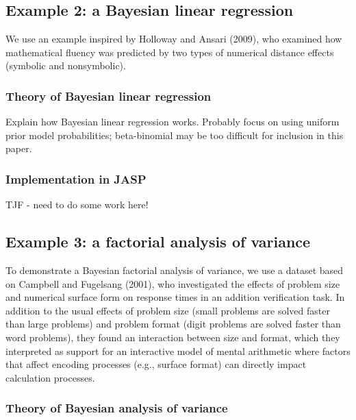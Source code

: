 \documentclass[english,,doc,floatsintext]{apa6}
\begin{document}
\hypertarget{example-2-a-bayesian-linear-regression}{%
\subsection{Example 2: a Bayesian linear regression}\label{example-2-a-bayesian-linear-regression}}

We use an example inspired by Holloway and Ansari (2009), who examined how mathematical fluency was predicted by two types of numerical distance effects (symbolic and nonsymbolic).

\hypertarget{theory-of-bayesian-linear-regression}{%
\subsubsection{Theory of Bayesian linear regression}\label{theory-of-bayesian-linear-regression}}

Explain how Bayesian linear regression works. Probably focus on using uniform prior model probabilities; beta-binomial may be too difficult for inclusion in this paper.

\hypertarget{implementation-in-jasp-1}{%
\subsubsection{Implementation in JASP}\label{implementation-in-jasp-1}}

TJF - need to do some work here!

\hypertarget{example-3-a-factorial-analysis-of-variance}{%
\subsection{Example 3: a factorial analysis of variance}\label{example-3-a-factorial-analysis-of-variance}}

To demonstrate a Bayesian factorial analysis of variance, we use a dataset based on Campbell and Fugelsang (2001), who investigated the effects of problem size and numerical surface form on response times in an addition verification task. In addition to the usual effects of problem size (small problems are solved faster than large problems) and problem format (digit problems are solved faster than word problems), they found an interaction between size and format, which they interpreted as support for an interactive model of mental arithmetic where factors that affect encoding processes (e.g., surface format) can directly impact calculation processes.

\hypertarget{theory-of-bayesian-analysis-of-variance}{%
\subsubsection{Theory of Bayesian analysis of variance}\label{theory-of-bayesian-analysis-of-variance}}
\end{document}
